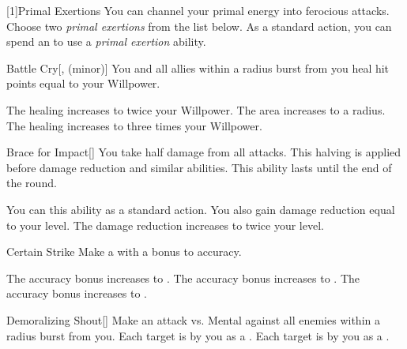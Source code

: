         [1]{Primal Exertions}
        You can channel your primal energy into ferocious attacks.
        Choose two \textit{primal exertions} from the list below.
        As a standard action, you can spend an  to use a \textit{primal exertion} ability.
        {
            \begin{ability}{Battle Cry}[,  (minor)]
                You and all allies within a \arealarge radius burst from you heal hit points equal to your Willpower.

                \rankline
                 The healing increases to twice your Willpower.
                 The area increases to a \areahuge radius.
                 The healing increases to three times your Willpower.
            \end{ability}

            \begin{ability}{Brace for Impact}[]
                You take half damage from all attacks.
                This halving is applied before damage reduction and similar abilities.
                This ability lasts until the end of the round.

                \rankline
                 You can  this ability as a standard action.
                 You also gain damage reduction equal to your level.
                 The damage reduction increases to twice your level.
            \end{ability}

            \begin{ability}{Certain Strike}
                Make a  with a  bonus to accuracy.

                \rankline
                 The accuracy bonus increases to .
                 The accuracy bonus increases to .
                 The accuracy bonus increases to .
            \end{ability}

            \begin{ability}{Demoralizing Shout}[]
                Make an attack vs. Mental against all enemies within a \arealarge radius burst from you.
                \hit Each target is  by you as a .
                \crit Each target is  by you as a .


\end{ability}}
